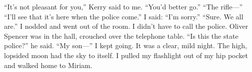 \documentclass{novel}
\begin{document}
“It’s not pleasant for you,” Kerry said to me. “You’d better go.” “The rifle—” “I’ll see that it’s here when the police come.” I said: “I’m sorry.” “Sure. We all are.” I nodded and went out of the room. I didn’t have to call the police. Oliver Spencer was in the hall, crouched over the telephone table. “Is this the state police?” he said. “My son—” I kept going. It was a clear, mild night. The high, lopsided moon had the sky to itself. I pulled my flashlight out of my hip pocket and walked home to Miriam.


\begin{ChapterStart}

\vspace{3\nbs}
\end{ChapterStart}

\end{document}
